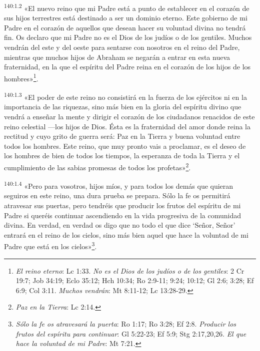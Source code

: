 \par 
\textsuperscript{140:1.2} «El nuevo reino que mi Padre está a punto de establecer en el corazón de sus hijos terrestres está destinado a ser un dominio eterno. Este gobierno de mi Padre en el corazón de aquellos que desean hacer su voluntad divina no tendrá fin. Os declaro que mi Padre no es el Dios de los judíos o de los gentiles. Muchos vendrán del este y del oeste para sentarse con nosotros en el reino del Padre, mientras que muchos hijos de Abraham se negarán a entrar en esta nueva fraternidad, en la que el espíritu del Padre reina en el corazón de los hijos de los hombres»\footnote{\textit{El reino eterno}: Lc 1:33. \textit{No es el Dios de los judíos o de los gentiles}: 2 Cr 19:7; Job 34:19; Eclo 35:12; Hch 10:34; Ro 2:9-11; 9:24; 10:12; Gl 2:6; 3:28; Ef 6:9; Col 3:11. \textit{Muchos vendrán}: Mt 8:11-12; Lc 13:28-29.}.

\par 
\textsuperscript{140:1.3} «El poder de este reino no consistirá en la fuerza de los ejércitos ni en la importancia de las riquezas, sino más bien en la gloria del espíritu divino que vendrá a enseñar la mente y dirigir el corazón de los ciudadanos renacidos de este reino celestial ---los hijos de Dios. Ésta es la fraternidad del amor donde reina la rectitud y cuyo grito de guerra será: Paz en la Tierra y buena voluntad entre todos los hombres. Este reino, que muy pronto vais a proclamar, es el deseo de los hombres de bien de todos los tiempos, la esperanza de toda la Tierra y el cumplimiento de las sabias promesas de todos los profetas»\footnote{\textit{Paz en la Tierra}: Lc 2:14.}.

\par 
\textsuperscript{140:1.4} «Pero para vosotros, hijos míos, y para todos los demás que quieran seguiros en este reino, una dura prueba se prepara. Sólo la fe os permitirá atravesar sus puertas, pero tendréis que producir los frutos del espíritu de mi Padre si queréis continuar ascendiendo en la vida progresiva de la comunidad divina. En verdad, en verdad os digo que no todo el que dice `Señor, Señor' entrará en el reino de los cielos, sino más bien aquel que hace la voluntad de mi Padre que está en los cielos»\footnote{\textit{Sólo la fe os atravesará la puerta}: Ro 1:17; Ro 3:28; Ef 2:8. \textit{Producir los frutos del espíritu para continuar}: Gl 5:22-23; Ef 5:9; Stg 2:17,20,26. \textit{El que hace la voluntad de mi Padre}: Mt 7:21.}.

